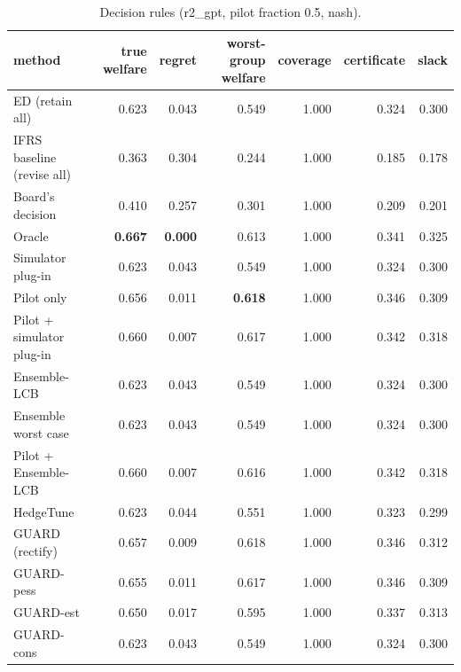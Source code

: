 \begin{table}[t]
\centering
\small
\begin{tabular}{lrrrrrr}
\toprule
method & true welfare & regret & worst-group welfare & coverage & certificate & slack \\
\midrule
ED (retain all) & 0.623 & 0.043 & 0.549 & 1.000 & 0.324 & 0.300 \\
IFRS baseline (revise all) & 0.363 & 0.304 & 0.244 & 1.000 & 0.185 & 0.178 \\
Board's decision & 0.410 & 0.257 & 0.301 & 1.000 & 0.209 & 0.201 \\
Oracle & \textbf{0.667} & \textbf{0.000} & 0.613 & 1.000 & 0.341 & 0.325 \\
Simulator plug-in & 0.623 & 0.043 & 0.549 & 1.000 & 0.324 & 0.300 \\
Pilot only & 0.656 & 0.011 & \textbf{0.618} & 1.000 & 0.346 & 0.309 \\
Pilot + simulator plug-in & 0.660 & 0.007 & 0.617 & 1.000 & 0.342 & 0.318 \\
Ensemble-LCB & 0.623 & 0.043 & 0.549 & 1.000 & 0.324 & 0.300 \\
Ensemble worst case & 0.623 & 0.043 & 0.549 & 1.000 & 0.324 & 0.300 \\
Pilot + Ensemble-LCB & 0.660 & 0.007 & 0.616 & 1.000 & 0.342 & 0.318 \\
HedgeTune & 0.623 & 0.044 & 0.551 & 1.000 & 0.323 & 0.299 \\
GUARD (rectify) & 0.657 & 0.009 & 0.618 & 1.000 & 0.346 & 0.312 \\
GUARD-pess & 0.655 & 0.011 & 0.617 & 1.000 & 0.346 & 0.309 \\
GUARD-est & 0.650 & 0.017 & 0.595 & 1.000 & 0.337 & 0.313 \\
GUARD-cons & 0.623 & 0.043 & 0.549 & 1.000 & 0.324 & 0.300 \\
\bottomrule
\end{tabular}
\caption{Decision rules (r2\_gpt, pilot fraction 0.5, nash).}
\label{tab:methods-nash}
\end{table}
